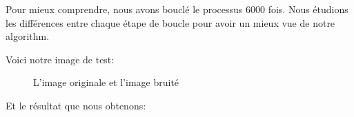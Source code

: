 \documentclass[
  11pt,
  dvipsnames]{article}
\begin{document}
Pour mieux comprendre, nous avons bouclé le processus 6000 fois. Nous étudions
les différences entre chaque étape de boucle pour avoir un mieux vue de notre
algorithm.

Voici notre image de test:

\begin{figure}

{\centering {}

}

\caption{L'image originale et l'image bruité}\label{fig:noisy-original-image}
\end{figure}

Et le résultat que nous obtenons:
\end{document}
